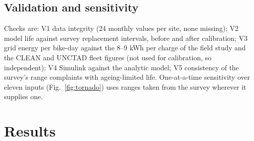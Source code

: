 \documentclass[11pt,a4paper]{article}
\newcommand{\figref}[1]{Fig.~\ref{fig:#1}}
\begin{document}
\subsection{Validation and sensitivity}
Checks are: V1 data integrity (24 monthly values per site, none missing); V2 model life against survey replacement intervals, before and after calibration; V3 grid energy per bike-day against the 8--9 kWh per charge of the field study \cite{chowdhury2026} and the CLEAN and UNCTAD fleet figures \cite{clean2024,unctad_smep} (not used for calibration, so independent); V4 Simulink against the analytic model; V5 consistency of the survey's range complaints with ageing-limited life. One-at-a-time sensitivity over eleven inputs (\figref{tornado}) uses ranges taken from the survey wherever it supplies one.

\section{Results}
\label{sec:results}
\end{document}
